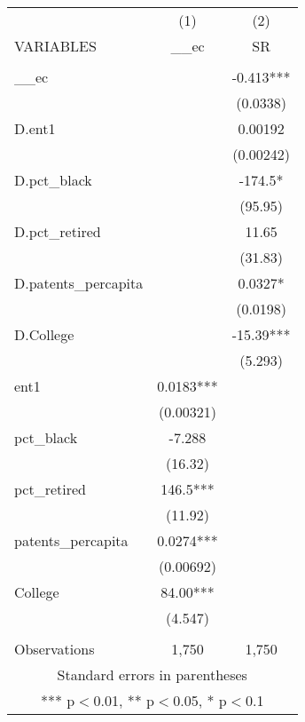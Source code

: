 \begin{tabular}{lcc} \hline
 & (1) & (2) \\
VARIABLES & \_\_ec & SR \\ \hline
 &  &  \\
\_\_ec &  & -0.413*** \\
 &  & (0.0338) \\
D.ent1 &  & 0.00192 \\
 &  & (0.00242) \\
D.pct\_black &  & -174.5* \\
 &  & (95.95) \\
D.pct\_retired &  & 11.65 \\
 &  & (31.83) \\
D.patents\_percapita &  & 0.0327* \\
 &  & (0.0198) \\
D.College &  & -15.39*** \\
 &  & (5.293) \\
ent1 & 0.0183*** &  \\
 & (0.00321) &  \\
pct\_black & -7.288 &  \\
 & (16.32) &  \\
pct\_retired & 146.5*** &  \\
 & (11.92) &  \\
patents\_percapita & 0.0274*** &  \\
 & (0.00692) &  \\
College & 84.00*** &  \\
 & (4.547) &  \\
 &  &  \\
 Observations & 1,750 & 1,750 \\ \hline
\multicolumn{3}{c}{ Standard errors in parentheses} \\
\multicolumn{3}{c}{ *** p$<$0.01, ** p$<$0.05, * p$<$0.1} \\
\end{tabular}
